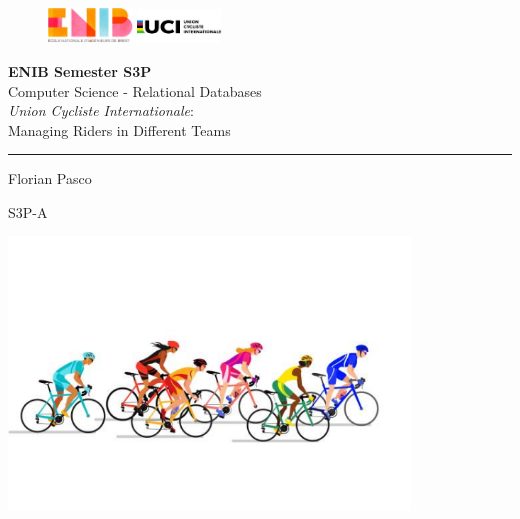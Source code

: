 \documentclass[a4paper,twoside]{article}
\begin{document}
\begin{figure}[t]
    \includegraphics[width=0.2\textwidth]{enib.jpg} \hfill
    \includegraphics[width=0.2\textwidth]{etr.jpg}
\end{figure}

\begin{titlepage}
\begin{center}
    \textbf{ENIB Semester S3P} \\
    Computer Science - Relational Databases \\
    \vspace{2cm}
    \huge{\textsl{Union Cycliste Internationale}: \\
    Managing Riders in Different Teams}
    \vspace{1cm}
    \rule{\linewidth}{1pt}
\end{center}

\begin{minipage}[t]{0.47\textwidth}
    \large Florian Pasco
\end{minipage}
\hfill
\begin{minipage}[t]{0.47\textwidth} \raggedleft
    \large S3P-A
\end{minipage}

\vspace{2cm}
\centering
\includegraphics[width=0.8\textwidth]{guardpage.jpg}

\vspace{0.5cm}
\end{titlepage}

\tableofcontents
\listoffigures

\newpage

  
  
  
  
  
  
  
  
\end{document}
